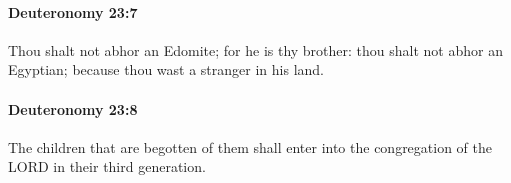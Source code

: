 		\paragraph{Deuteronomy 23:7} %
			\label{DEUTERONOMY-23-7}

			Thou shalt not abhor an Edomite; for he is thy brother: thou shalt not abhor an Egyptian; because thou wast a stranger in his land.


		\paragraph{Deuteronomy 23:8} %
			\label{DEUTERONOMY-23-8}

			The children that are begotten of them shall enter into the congregation of the LORD in their third generation.


